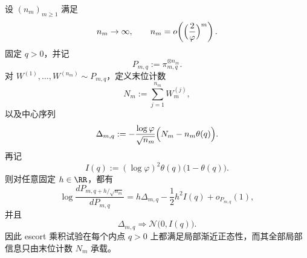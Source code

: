 \begin{theorem}\label{thm:xi-time-part9ob-escort-lan-lastbit}
设 \((n_m)_{m\ge 1}\) 满足
\[
n_m\to\infty,
\qquad
n_m=o\!\left(\Bigl(\frac{2}{\varphi}\Bigr)^m\right).
\]
固定 \(q>0\)，并记
\[
P_{m,q}:=\pi_{m,q}^{\otimes n_m}.
\]
对 \(W^{(1)},\dots,W^{(n_m)}\sim P_{m,q}\)，定义末位计数
\[
N_m:=\sum_{j=1}^{n_m}W^{(j)}_m,
\]
以及中心序列
\[
\Delta_{m,q}:=
-\frac{\log\varphi}{\sqrt{n_m}}
\Bigl(N_m-n_m\theta(q)\Bigr).
\]
再记
\[
I(q):=(\log\varphi)^2\theta(q)\bigl(1-\theta(q)\bigr).
\]
则对任意固定 \(h\in\RR\)，都有
\[
\log\frac{dP_{m,q+h/\sqrt{n_m}}}{dP_{m,q}}
=
h\Delta_{m,q}
-\frac12 h^2 I(q)
+o_{P_{m,q}}(1),
\]
并且
\[
\Delta_{m,q}\Rightarrow \mathcal N\!\bigl(0,I(q)\bigr).
\]
因此 escort 乘积试验在每个内点 \(q>0\) 上都满足局部渐近正态性，而其全部局部信息只由末位计数 \(N_m\) 承载。
\end{theorem}
